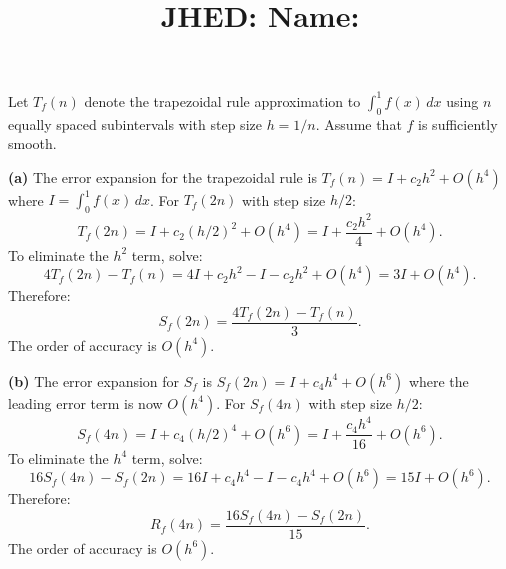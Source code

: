 \documentclass[reqno]{exam}
\title{\normalsize{
  JHED: \underline{\hspace{4cm}} \hspace{1em} Name: \underline{\hspace{9cm}}}
   }
\author{}
\date{}
\begin{document}
\maketitle
\vspace{-2cm} %

\begin{questions}
  \question

  Let $T_f(n)$ denote the trapezoidal rule approximation to $\int_0^1 f(x) \, dx$ using $n$ equally spaced subintervals with step size $h = 1/n$. Assume that $f$ is sufficiently smooth.


  \begin{solution}
    \textbf{(a)} The error expansion for the trapezoidal rule is $T_f(n) = I + c_2h^2 + O(h^4)$ where $I = \int_0^1 f(x)\,dx$. For $T_f(2n)$ with step size $h/2$:
    $$T_f(2n) = I + c_2(h/2)^2 + O(h^4) = I + \frac{c_2h^2}{4} + O(h^4).$$
    To eliminate the $h^2$ term, solve:
    $$4T_f(2n) - T_f(n) = 4I + c_2h^2 - I - c_2h^2 + O(h^4) = 3I + O(h^4).$$
    Therefore:
    $$S_f(2n) = \frac{4T_f(2n) - T_f(n)}{3}.$$
    The order of accuracy is $O(h^4)$.

    \textbf{(b)} The error expansion for $S_f$ is $S_f(2n) = I + c_4h^4 + O(h^6)$ where the leading error term is now $O(h^4)$. For $S_f(4n)$ with step size $h/2$:
    $$S_f(4n) = I + c_4(h/2)^4 + O(h^6) = I + \frac{c_4h^4}{16} + O(h^6).$$
    To eliminate the $h^4$ term, solve:
    $$16S_f(4n) - S_f(2n) = 16I + c_4h^4 - I - c_4h^4 + O(h^6) = 15I + O(h^6).$$
    Therefore:
    $$R_f(4n) = \frac{16S_f(4n) - S_f(2n)}{15}.$$
    The order of accuracy is $O(h^6)$.


\end{solution}
\end{questions}
\end{document}
